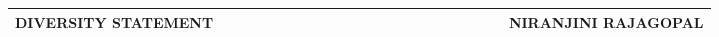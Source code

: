\documentclass[10pt]{article}
\date{}
\begin{document}
\begin{table}
\color{blue}
\begin{tabular*}{\textwidth}{l r}
\large\textbf{DIVERSITY STATEMENT} & 
\hfill \ \ \ \ \ \ \ \ \ \ \ \ \ \ \ \ \ \ \ \
\ \ \ \ \ \ \ \ \ \ \ \ \ \ \ 
\large\textbf{NIRANJINI RAJAGOPAL}\\
\hline
\end{tabular*}

\end{table}







\end{document}
